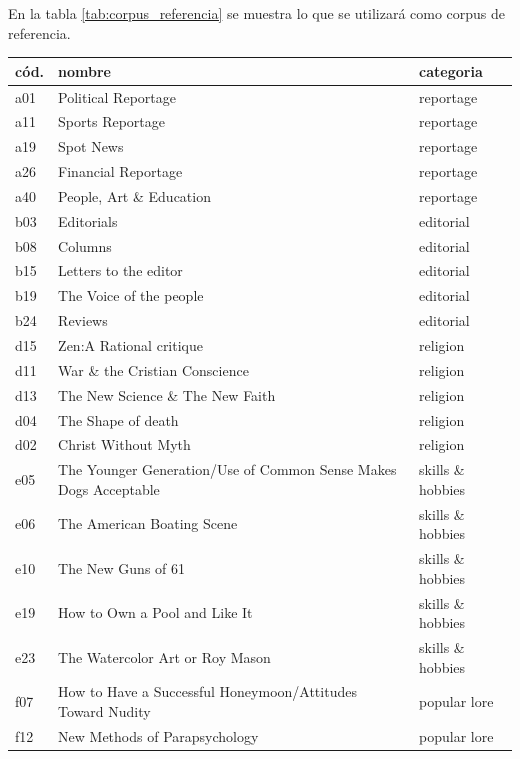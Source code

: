 \documentclass[12pt,letterpaper,twoside]{article}
\begin{document}
En la tabla \ref{tab:corpus_referencia} se muestra lo que se
utilizará como corpus de referencia.



    \begin{longtable}{| p{} | p{} | p{}|} 
    \hline
        cód.  & nombre  & categoria  \\ \hline
        a01 & Political Reportage & reportage  \\ \hline
        a11 & Sports Reportage & reportage  \\ \hline
        a19 & Spot News & reportage  \\ \hline
        a26 & Financial Reportage & reportage  \\ \hline
        a40 & People, Art \& Education & reportage \\ \hline
        b03 & Editorials & editorial  \\ \hline
        b08 & Columns & editorial  \\ \hline
        b15 & Letters to the editor & editorial  \\ \hline
        b19 & The Voice of the people & editorial \\ \hline
        b24 & Reviews & editorial \\ \hline
        d15 & Zen:A Rational critique & religion  \\ \hline
        d11 & War \& the Cristian Conscience & religion  \\ \hline
        d13 & The New Science \& The New Faith & religion  \\ \hline
        d04 & The Shape of death & religion  \\ \hline
        d02 & Christ Without Myth & religion  \\ \hline
        e05 & The Younger Generation/Use of Common Sense Makes Dogs Acceptable & skills \& hobbies \\ \hline
        e06 & The American Boating Scene & skills \& hobbies  \\ \hline
        e10 & The New Guns of 61 & skills \& hobbies  \\ \hline
        e19 & How to Own a Pool and Like It & skills \& hobbies  \\ \hline
        e23 & The Watercolor Art or Roy Mason & skills \& hobbies  \\ \hline
        f07 & How to Have a Successful Honeymoon/Attitudes Toward Nudity & popular lore  \\ \hline
        f12 & New Methods of Parapsychology & popular lore  \\ \hline

\end{longtable}
\end{document}

